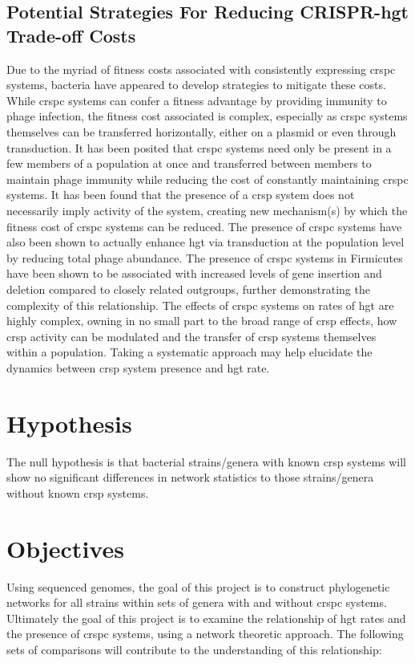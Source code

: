\documentclass[12pt,letter]{article}
\begin{document}
\subsection*{Potential Strategies For Reducing CRISPR-\ac{hgt} Trade-off Costs}
Due to the  myriad of fitness costs associated with consistently expressing \ac{crspc} systems, bacteria have appeared to develop strategies to mitigate these costs.
While \ac{crspc} systems can confer a fitness advantage by providing immunity to phage infection, the fitness cost associated is complex, especially as \ac{crspc} systems  themselves can be transferred  horizontally, either on a plasmid or even through transduction\citep{crisprlgt}.
It has been posited that \ac{crspc} systems need only be present in a few members of a population at once and transferred between members to maintain phage immunity while reducing the cost of constantly maintaining \ac{crspc} systems\citep{acqorres}.
It has been found that the presence of a \ac{crsp} system does not necessarily imply activity of the system, creating new mechanism(s) by which the fitness cost of \ac{crspc} systems can be reduced\citep{acqorres}.
The presence of \ac{crspc} systems have also been shown to actually enhance \ac{hgt} via transduction at the population level by reducing total phage abundance\citep{transhgt}.
The presence of \ac{crspc} systems in Firmicutes have been shown to be associated with increased levels of gene insertion and deletion compared to closely related outgroups, further demonstrating the complexity of this relationship\citep{athena}.
The effects of \ac{crspc} systems on rates of \ac{hgt} are highly complex, owning in no small part to the broad range of \ac{crsp} effects, how \ac{crsp} activity can be modulated and the transfer of \ac{crsp} systems themselves within a population\citep{acqorres}.
Taking a systematic approach may help elucidate the dynamics between \ac{crsp} system presence and \ac{hgt} rate.
\section*{\huge Hypothesis}
The null hypothesis is that bacterial strains/genera with known \ac{crsp} systems will show no significant differences in network statistics to those strains/genera without known \ac{crsp} systems.
\section*{\huge Objectives}
Using sequenced genomes, the goal of this project is to construct phylogenetic networks for all strains within sets of genera with and without \ac{crspc} systems.
Ultimately the goal of this project is to examine the relationship of \ac{hgt} rates and the presence of \ac{crspc} systems, using a network theoretic approach. The following sets of comparisons will contribute to the understanding of this relationship:
\end{document}

